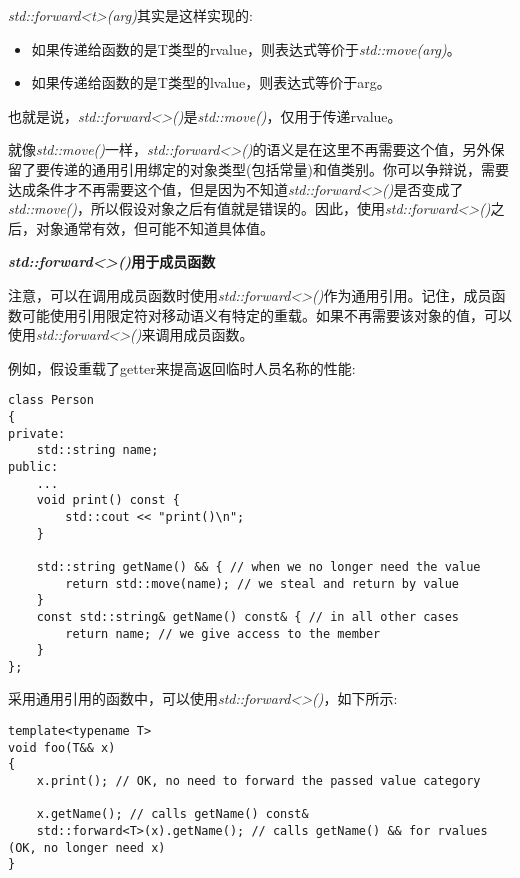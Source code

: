 \textit{std::forward<t>(arg)}其实是这样实现的:\par

\begin{itemize}
	\item 如果传递给函数的是T类型的rvalue，则表达式等价于\textit{std::move(arg)}。
	\item 如果传递给函数的是T类型的lvalue，则表达式等价于arg。
\end{itemize}

也就是说，\textit{std::forward<>()}是\textit{std::move()}，仅用于传递rvalue。\par

就像\textit{std::move()}一样，\textit{std::forward<>()}的语义是在这里不再需要这个值，另外保留了要传递的通用引用绑定的对象类型(包括常量)和值类别。你可以争辩说，需要达成条件才不再需要这个值，但是因为不知道\textit{std::forward<>()}是否变成了\textit{std::move()}，所以假设对象之后有值就是错误的。因此，使用\textit{std::forward<>()}之后，对象通常有效，但可能不知道具体值。\par

\hspace*{\fill} \par %
\textbf{\textit{std::forward<>()}用于成员函数}

注意，可以在调用成员函数时使用\textit{std::forward<>()}作为通用引用。记住，成员函数可能使用引用限定符对移动语义有特定的重载。如果不再需要该对象的值，可以使用\textit{std::forward<>()}来调用成员函数。\par

例如，假设重载了getter来提高返回临时人员名称的性能:\par

\begin{lstlisting}[caption={}]
class Person
{
private:
	std::string name;
public:
	...
	void print() const {
		std::cout << "print()\n";
	}

	std::string getName() && { // when we no longer need the value
		return std::move(name); // we steal and return by value
	}
	const std::string& getName() const& { // in all other cases
		return name; // we give access to the member
	}
};
\end{lstlisting}

采用通用引用的函数中，可以使用\textit{std::forward<>()}，如下所示:\par

\begin{lstlisting}[caption={}]
template<typename T>
void foo(T&& x)
{
	x.print(); // OK, no need to forward the passed value category
	
	x.getName(); // calls getName() const&
	std::forward<T>(x).getName(); // calls getName() && for rvalues (OK, no longer need x)
}
\end{lstlisting}

